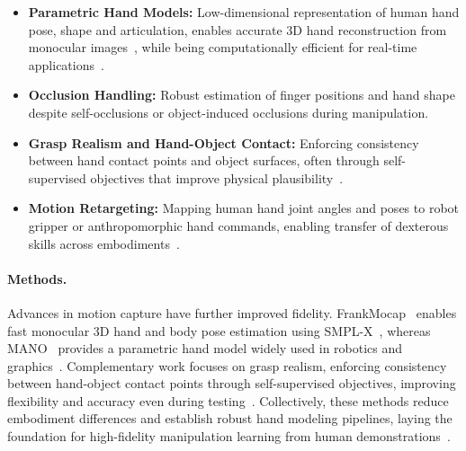 \begin{itemize}
    \item \textbf{Parametric Hand Models:} 
    Low-dimensional representation of human hand pose, shape and articulation, enables accurate 3D hand reconstruction from monocular images~\cite{Rong2020FrankMocapFM, Pavlakos2019ExpressiveBC}, while being computationally efficient for real-time applications~\cite{Romero2017EmbodiedH}.

    
    \item \textbf{Occlusion Handling:} Robust estimation of finger positions and hand shape despite self-occlusions or object-induced occlusions during manipulation.
    
    \item \textbf{Grasp Realism and Hand-Object Contact:} Enforcing consistency between hand contact points and object surfaces, often through self-supervised objectives that improve physical plausibility~\cite{Jiang2021HandObjectCC}.
    
    \item \textbf{Motion Retargeting:} Mapping human hand joint angles and poses to robot gripper or anthropomorphic hand commands, enabling transfer of dexterous skills across embodiments~\cite{Shaw2023LEAPHL}.
\end{itemize}


\paragraph{Methods.}


Advances in motion capture have further improved fidelity. FrankMocap~\cite{Rong2020FrankMocapFM} enables fast monocular 3D hand and body pose estimation using SMPL-X~\cite{Pavlakos2019ExpressiveBC}, whereas MANO~\cite{Romero2017EmbodiedH} provides a parametric hand model widely used in robotics and graphics~\cite{Romero2017EmbodiedH, Loper2023SMPLAS}. Complementary work focuses on grasp realism, enforcing consistency between hand-object contact points through self-supervised objectives, improving flexibility and accuracy even during testing~\cite{Jiang2021HandObjectCC}.
Collectively, these methods reduce embodiment differences and establish robust hand modeling pipelines, laying the foundation for high-fidelity manipulation learning from human demonstrations~\cite{Shaw2023LEAPHL, Mandikal2022DexVIPLD, Romero2017EmbodiedH}.




